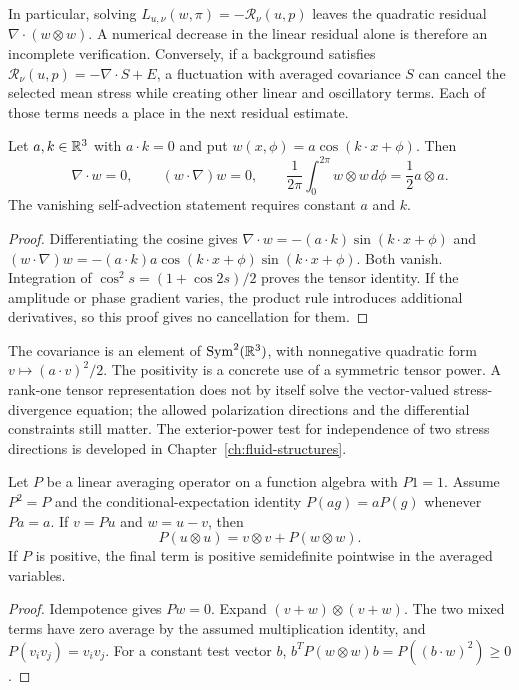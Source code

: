 In particular, solving $L_{u,\nu}(w,\pi)=-\mathcal R_\nu(u,p)$ leaves the
quadratic residual $\nabla\cdot(w\otimes w)$. A numerical decrease in the
linear residual alone is therefore an incomplete verification. Conversely,
if a background satisfies
$\mathcal R_\nu(u,p)=-\nabla\cdot S+E$, a fluctuation with averaged
covariance $S$ can cancel the selected mean stress while creating other
linear and oscillatory terms. Each of those terms needs a place in the next
residual estimate.

\begin{proposition}
\label{prop:ns-transverse-wave}
Let $a,k\in\mathbb{R}^3$ with $a\cdot k=0$ and put
$w(x,\phi)=a\cos(k\cdot x+\phi)$. Then
\[
 \nabla\cdot w=0,\qquad (w\cdot\nabla)w=0,\qquad
 \frac1{2\pi}\int_0^{2\pi}w\otimes w\,d\phi
       =\frac12a\otimes a.
\]
The vanishing self-advection statement requires constant $a$ and $k$.
\end{proposition}
\begin{proof}
Differentiating the cosine gives
$\nabla\cdot w=-(a\cdot k)\sin(k\cdot x+\phi)$ and
$(w\cdot\nabla)w=-(a\cdot k)a\cos(k\cdot x+\phi)
\sin(k\cdot x+\phi)$. Both vanish. Integration of
$\cos^2s=(1+\cos2s)/2$ proves the tensor identity.
If the amplitude or phase gradient varies, the product rule introduces
additional derivatives, so this proof gives no cancellation for them.
\end{proof}

The covariance is an element of $\operatorname{Sym}^2(\mathbb{R}^3)$, with nonnegative quadratic
form $v\mapsto (a\cdot v)^2/2$. The positivity is a concrete use of a
symmetric tensor power. A rank-one tensor representation does not by itself
solve the vector-valued stress-divergence equation; the allowed polarization
directions and the differential constraints still matter. The exterior-power
test for independence of two stress directions is developed in
Chapter~\ref{ch:fluid-structures}.

\begin{proposition}
\label{prop:ns-average-defect}
Let $P$ be a linear averaging operator on a function algebra with $P1=1$.
Assume $P^2=P$ and the conditional-expectation identity
$P(ag)=aP(g)$ whenever $Pa=a$. If $v=Pu$ and $w=u-v$, then
\[
 P(u\otimes u)=v\otimes v+P(w\otimes w).
\]
If $P$ is positive, the final term is positive semidefinite pointwise in
the averaged variables.
\end{proposition}
\begin{proof}
Idempotence gives $Pw=0$. Expand $(v+w)\otimes(v+w)$. The two mixed
terms have zero average by the assumed multiplication identity, and
$P(v_i v_j)=v_iv_j$. For a constant test vector $b$,
$b^TP(w\otimes w)b=P((b\cdot w)^2)\geq0$.
\end{proof}

